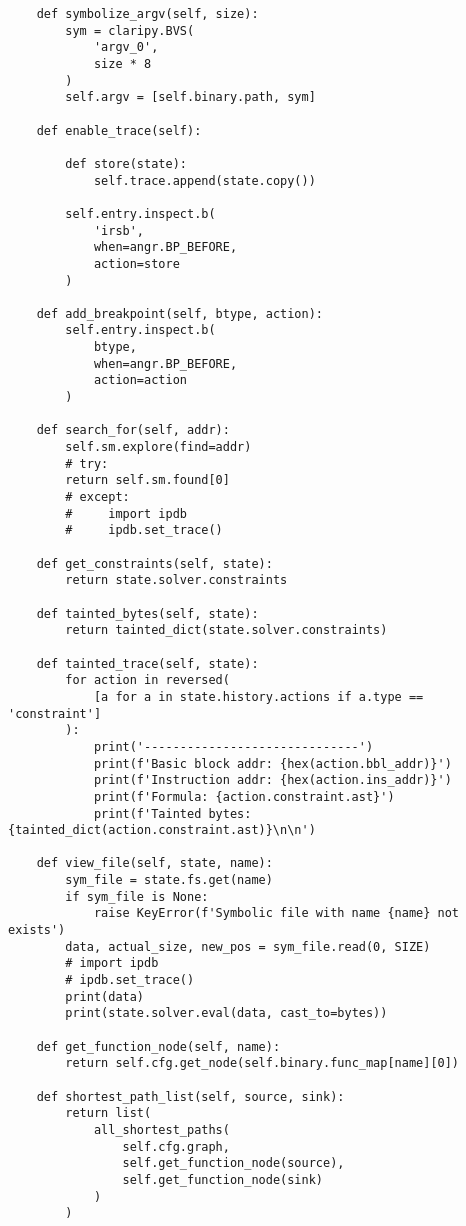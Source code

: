 \begin{lstlisting}
    def symbolize_argv(self, size):
        sym = claripy.BVS(
            'argv_0',
            size * 8
        )
        self.argv = [self.binary.path, sym]

    def enable_trace(self):

        def store(state):
            self.trace.append(state.copy())

        self.entry.inspect.b(
            'irsb',
            when=angr.BP_BEFORE,
            action=store
        )

    def add_breakpoint(self, btype, action):
        self.entry.inspect.b(
            btype,
            when=angr.BP_BEFORE,
            action=action
        )

    def search_for(self, addr):
        self.sm.explore(find=addr)
        # try:
        return self.sm.found[0]
        # except:
        #     import ipdb
        #     ipdb.set_trace()

    def get_constraints(self, state):
        return state.solver.constraints

    def tainted_bytes(self, state):
        return tainted_dict(state.solver.constraints)

    def tainted_trace(self, state):
        for action in reversed(
            [a for a in state.history.actions if a.type == 'constraint']
        ):
            print('------------------------------')
            print(f'Basic block addr: {hex(action.bbl_addr)}')
            print(f'Instruction addr: {hex(action.ins_addr)}')
            print(f'Formula: {action.constraint.ast}')
            print(f'Tainted bytes: {tainted_dict(action.constraint.ast)}\n\n')

    def view_file(self, state, name):
        sym_file = state.fs.get(name)
        if sym_file is None:
            raise KeyError(f'Symbolic file with name {name} not exists')
        data, actual_size, new_pos = sym_file.read(0, SIZE)
        # import ipdb
        # ipdb.set_trace()
        print(data)
        print(state.solver.eval(data, cast_to=bytes))

    def get_function_node(self, name):
        return self.cfg.get_node(self.binary.func_map[name][0])

    def shortest_path_list(self, source, sink):
        return list(
            all_shortest_paths(
                self.cfg.graph,
                self.get_function_node(source),
                self.get_function_node(sink)
            )
        )




\end{lstlisting}
